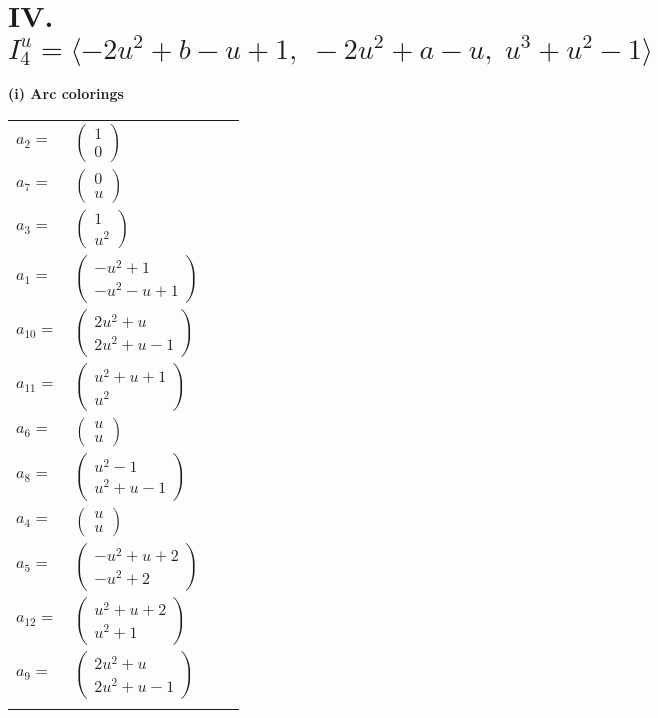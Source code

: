 \documentclass[1p]{elsarticle_modified}
\theoremstyle{definition}
\begin{document}
\centering \section*{IV. $I^u_{4}= \langle -2 u^2+b- u+1,\;-2 u^2+a- u,\;u^3+u^2-1 \rangle$}
\flushleft \textbf{(i) Arc colorings}\\
\begin{tabular}{m{7pt} m{180pt} m{7pt} m{180pt} }
\flushright $a_{2}=$&$\begin{pmatrix}1\\0\end{pmatrix}$ \\
\flushright $a_{7}=$&$\begin{pmatrix}0\\u\end{pmatrix}$ \\
\flushright $a_{3}=$&$\begin{pmatrix}1\\u^2\end{pmatrix}$ \\
\flushright $a_{1}=$&$\begin{pmatrix}- u^2+1\\- u^2- u+1\end{pmatrix}$ \\
\flushright $a_{10}=$&$\begin{pmatrix}2 u^2+u\\2 u^2+u-1\end{pmatrix}$ \\
\flushright $a_{11}=$&$\begin{pmatrix}u^2+u+1\\u^2\end{pmatrix}$ \\
\flushright $a_{6}=$&$\begin{pmatrix}u\\u\end{pmatrix}$ \\
\flushright $a_{8}=$&$\begin{pmatrix}u^2-1\\u^2+u-1\end{pmatrix}$ \\
\flushright $a_{4}=$&$\begin{pmatrix}u\\u\end{pmatrix}$ \\
\flushright $a_{5}=$&$\begin{pmatrix}- u^2+u+2\\- u^2+2\end{pmatrix}$ \\
\flushright $a_{12}=$&$\begin{pmatrix}u^2+u+2\\u^2+1\end{pmatrix}$ \\
\flushright $a_{9}=$&$\begin{pmatrix}2 u^2+u\\2 u^2+u-1\end{pmatrix}$\\&\end{tabular}
\end{document}
